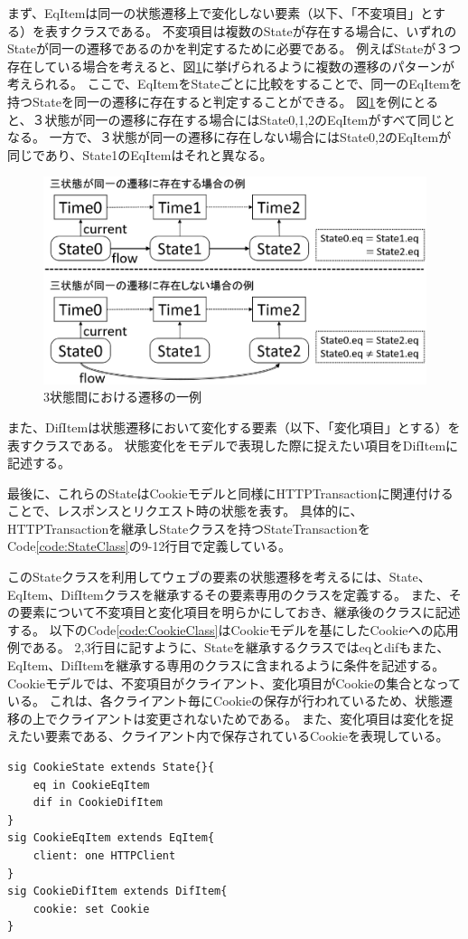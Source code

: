 \documentclass[12pt,a4paper]{jbook}
\begin{document}
まず、EqItemは同一の状態遷移上で変化しない要素（以下、「不変項目」とする）を表すクラスである。
不変項目は複数のStateが存在する場合に、いずれのStateが同一の遷移であるのかを判定するために必要である。
例えばStateが３つ存在している場合を考えると、図\ref{fig:ProposedModel-3StateFlow}に挙げられるように複数の遷移のパターンが考えられる。
ここで、EqItemをStateごとに比較をすることで、同一のEqItemを持つStateを同一の遷移に存在すると判定することができる。
図\ref{fig:ProposedModel-3StateFlow}を例にとると、３状態が同一の遷移に存在する場合にはState0,1,2のEqItemがすべて同じとなる。
一方で、３状態が同一の遷移に存在しない場合にはState0,2のEqItemが同じであり、State1のEqItemはそれと異なる。

\begin{figure}[htb]
\centering
\includegraphics[width=400pt]{./fig/ProposedModel-3StateFlow.eps}
\caption{3状態間における遷移の一例}
\label{fig:ProposedModel-3StateFlow}
\end{figure}

また、DifItemは状態遷移において変化する要素（以下、「変化項目」とする）を表すクラスである。
状態変化をモデルで表現した際に捉えたい項目をDifItemに記述する。

最後に、これらのStateはCookieモデルと同様にHTTPTransactionに関連付けることで、レスポンスとリクエスト時の状態を表す。
具体的に、HTTPTransactionを継承しStateクラスを持つStateTransactionをCode\ref{code:StateClass}の9-12行目で定義している。

このStateクラスを利用してウェブの要素の状態遷移を考えるには、State、EqItem、DifItemクラスを継承するその要素専用のクラスを定義する。
また、その要素について不変項目と変化項目を明らかにしておき、継承後のクラスに記述する。
以下のCode\ref{code:CookieClass}はCookieモデルを基にしたCookieへの応用例である。
2,3行目に記すように、Stateを継承するクラスではeqとdifもまた、EqItem、DifItemを継承する専用のクラスに含まれるように条件を記述する。
Cookieモデルでは、不変項目がクライアント、変化項目がCookieの集合となっている。
これは、各クライアント毎にCookieの保存が行われているため、状態遷移の上でクライアントは変更されないためである。
また、変化項目は変化を捉えたい要素である、クライアント内で保存されているCookieを表現している。
\begin{lstlisting}[caption=Cookieへの応用例, label=code:CookieClass]
sig CookieState extends State{}{
	eq in CookieEqItem
	dif in CookieDifItem
}
sig CookieEqItem extends EqItem{
	client: one HTTPClient
}
sig CookieDifItem extends DifItem{
	cookie: set Cookie
}
\end{lstlisting}
\end{document}
